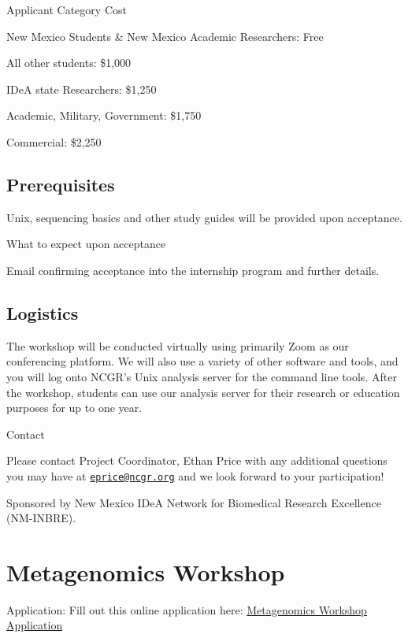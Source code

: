 \documentclass[
]{book}
\begin{document}
Applicant Category Cost

New Mexico Students \& New Mexico Academic Researchers:
Free

All other students:
\$1,000

IDeA state Researchers:
\$1,250

Academic, Military, Government:
\$1,750

Commercial:
\$2,250

\hypertarget{prerequisites-1}{%
\section*{Prerequisites}\label{prerequisites-1}}

Unix, sequencing basics and other study guides will be provided upon acceptance.

What to expect upon acceptance

Email confirming acceptance into the internship program and further details.

\hypertarget{logistics-1}{%
\section*{Logistics}\label{logistics-1}}

The workshop will be conducted virtually using primarily Zoom as our conferencing platform. We will also use a variety of other software and tools, and you will log onto NCGR's Unix analysis server for the command line tools. After the workshop, students can use our analysis server for their research or education purposes for up to one year.

Contact

Please contact Project Coordinator, Ethan Price with any additional questions you may have at \href{mailto:eprice@ncgr.org}{\nolinkurl{eprice@ncgr.org}} and we look forward to your participation!

Sponsored by New Mexico IDeA Network for Biomedical Research Excellence (NM-INBRE).

\hypertarget{metagenomics-workshop}{%
\chapter*{Metagenomics Workshop}\label{metagenomics-workshop}}

Application: Fill out this online application here: \href{https://sites.google.com/ncgr.org/ncgr-inbre/metagenomics?authuser=0}{Metagenomics Workshop Application}
\end{document}
